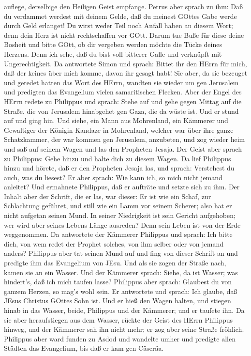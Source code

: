 auflege, derselbige den Heiligen Geist empfange.  Petrus
aber sprach zu ihm: Daß du verdammet werdest mit deinem Gelde, daß du
meinest GOttes Gabe werde durch Geld erlanget!  Du wirst
weder Teil noch Anfall haben an diesem Wort; denn dein Herz ist nicht
rechtschaffen vor GOtt.  Darum tue Buße für diese deine
Bosheit und bitte GOtt, ob dir vergeben werden möchte die Tücke deines
Herzens.  Denn ich sehe, daß du bist voll bitterer Galle
und verknüpft mit Ungerechtigkeit.  Da antwortete Simon und
sprach: Bittet ihr den HErrn für mich, daß der keines über mich komme,
davon ihr gesagt habt!  Sie aber, da sie bezeuget und
geredet hatten das Wort des HErrn, wandten sie wieder um gen Jerusalem
und predigten das Evangelium vielen samaritischen Flecken. 
Aber der Engel des HErrn redete zu Philippus und sprach: Stehe auf und
gehe gegen Mittag auf die Straße, die von Jerusalem hinabgehet gen Gaza,
die da wüste ist.  Und er stund auf und ging hin. Und
siehe, ein Mann aus Mohrenland, ein Kämmerer und Gewaltiger der Königin
Kandaze in Mohrenland, welcher war über ihre ganze Schatzkammer, der war
kommen gen Jerusalem, anzubeten,  und zog wieder heim und
saß auf seinem Wagen und las den Propheten Jesaja.  Der
Geist aber sprach zu Philippus: Gehe hinzu und halte dich zu diesem
Wagen.  Da lief Philippus hinzu und hörete, daß er den
Propheten Jesaja las, und sprach: Verstehest du auch, was du liesest?
 Er aber sprach: Wie kann ich, so mich nicht jemand
anleitet? Und ermahnete Philippus, daß er aufträte und setzte sich zu
ihm.  Der Inhalt aber der Schrift, die er las, war dieser:
Er ist wie ein Schaf, zur Schlachtung geführet, und still wie ein Lamm
vor seinem Scherer; also hat er nicht aufgetan seinen Mund.
 In seiner Niedrigkeit ist sein Gericht aufgehoben; wer
wird aber seines Lebens Länge ausreden? Denn sein Leben ist von der Erde
weggenommen.  Da antwortete der Kämmerer Philippus und
sprach: Ich bitte dich, von wem redet der Prophet solches, von ihm
selber oder von jemand anders?  Philippus aber tat seinen
Mund auf und fing von dieser Schrift an und predigte ihm das Evangelium
von JEsu.  Und als sie zogen der Straße nach, kamen sie an
ein Wasser. Und der Kämmerer sprach: Siehe, da ist Wasser; was
hindert's, daß ich mich taufen lasse?  Philippus aber
sprach: Glaubest du von ganzem Herzen, so mag's wohl sein. Er antwortete
und sprach: Ich glaube, daß JEsus Christus GOttes Sohn ist.
 Und er hieß den Wagen halten, und stiegen hinab in das
Wasser, beide, Philippus und der Kämmerer; und er taufete ihn.
 Da sie aber heraufstiegen aus dem Wasser, rückte der Geist
des HErrn Philippus hinweg, und der Kämmerer sah ihn nicht mehr; er zog
aber seine Straße fröhlich.  Philippus aber ward funden zu
Asdod und wandelte umher und predigte allen Städten das Evangelium, bis
daß er kam gen Cäseräa.

